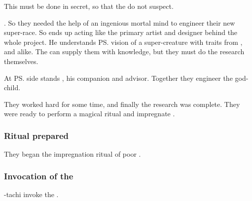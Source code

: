 This must be done in secret, so that the \dragons{} do not suspect.

. So they needed the help of an ingenious mortal mind to engineer their new super-race.
So \Semiza{} ends up acting like the primary artist and designer behind the whole \resphan{} project. He understands \ps{\Daggerrain}{} vision of a super-creature with traits from \banes, \voyagers{} and \nephilim{} alike. The \banes{} can supply them with knowledge, but they must do the research themselves.

At \ps{\Semiza}{} side stands , his companion and advisor. Together they engineer the \resphan{} god-child. 

They worked hard for some time, and finally the research was complete. 
They were ready to perform a magical ritual and impregnate \Ilu{}. 




\subsubsection{Ritual prepared}
They began the impregnation ritual of poor \Ilu. 





\subsubsection{Invocation of the \banes}
\Semiza-tachi invoke the \banes. 


